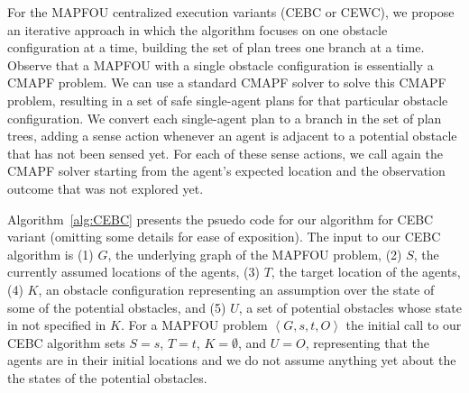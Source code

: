 \documentclass[letterpaper]{article} %
\newcommand{\tuple}[1]{\ensuremath{\left \langle #1 \right \rangle }}
\begin{document}
For the MAPFOU centralized execution variants (CEBC or CEWC), we propose an iterative approach in which the algorithm focuses on one obstacle configuration at a time, building the set of plan trees one branch at a time.
Observe that a MAPFOU with a single obstacle configuration is essentially a CMAPF problem.
We can use a standard CMAPF solver to solve this CMAPF problem, resulting in a set of safe single-agent plans for that particular obstacle configuration.
We convert each single-agent plan to a branch in the set of plan trees,
adding a sense action whenever an agent is adjacent to a potential obstacle that has not been sensed yet.
For each of these sense actions, we call again the CMAPF solver starting from the agent's expected location and the observation outcome that was not explored yet.

Algorithm~\ref{alg:CEBC} presents the psuedo code for our algorithm for CEBC variant (omitting some details for ease of exposition).
The input to our CEBC algorithm is
(1) $G$, the underlying graph of the MAPFOU problem,
(2) $S$, the currently assumed locations of the agents,
(3) $T$, the target location of the agents,
(4) $K$, an obstacle configuration representing an assumption over the state of some of the potential obstacles,
and (5) $U$, a set of potential obstacles whose state in not specified in $K$.
For a MAPFOU problem $\tuple{G,s,t,O}$ the initial call to our CEBC algorithm sets
$S=s$, $T=t$, $K=\emptyset$, and $U=O$, representing that the agents are in their initial locations and we do not assume anything yet about the the states of the potential obstacles.
\end{document}
